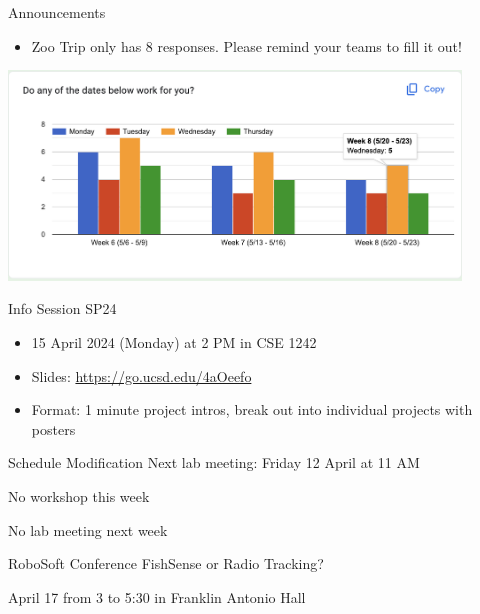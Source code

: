 
\begin{frame}{Announcements}
    \begin{itemize}
        \item Zoo Trip only has 8 responses. Please remind your teams to fill it out!
    \end{itemize}
    \includegraphics[width=0.9\textwidth]{images/ZooTripResponses.png}
\end{frame}

\begin{frame}{Info Session SP24}
    \begin{itemize}
        \item 15 April 2024 (Monday) at 2 PM in CSE 1242
        \item Slides: \url{https://go.ucsd.edu/4aOeefo}
        \item Format: 1 minute project intros, break out into individual projects with posters
    \end{itemize}
\end{frame}

\begin{frame}{Schedule Modification}
    Next lab meeting: Friday 12 April at 11 AM

    No workshop this week

    No lab meeting next week
\end{frame}

\begin{frame}{RoboSoft Conference}
    FishSense or Radio Tracking?

    April 17 from 3 to 5:30 in Franklin Antonio Hall
\end{frame}